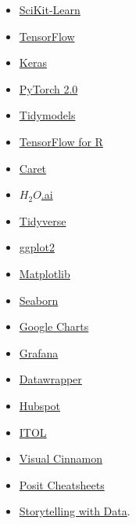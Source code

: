\documentclass[
]{article}
\providecommand{\tightlist}{%
  \setlength{\itemsep}{0pt}\setlength{\parskip}{0pt}}
\begin{document}
\begin{itemize}
\tightlist
\item
  \href{https://scikit-learn.org/stable/}{SciKit-Learn}
\item
  \href{https://www.tensorflow.org}{TensorFlow}
\item
  \href{https://keras.io/examples/}{Keras}
\item
  \href{https://pytorch.org}{PyTorch 2.0}
\item
  \href{https://www.tidymodels.org}{Tidymodels}
\item
  \href{https://tensorflow.rstudio.com/?_gl=1*mehmyf*_ga*MTMyMDE5NzEyMi4xNjg1MDMwNzUx*_ga_2C0WZ1JHG0*MTY4NTE1Njk4My40LjEuMTY4NTE1NzMyMy4wLjAuMA..}{TensorFlow
  for R}
\item
  \href{https://topepo.github.io/caret/}{Caret}
\item
  \href{https://docs.h2o.ai/h2o/latest-stable/h2o-docs/faq/r.html}{\(H_2O\).ai}
\item
  \href{https://www.tidyverse.org}{Tidyverse}
\item
  \href{https://exts.ggplot2.tidyverse.org/gallery/}{ggplot2}
\item
  \href{https://matplotlib.org/stable/index.html}{Matplotlib}
\item
  \href{https://jakevdp.github.io/PythonDataScienceHandbook/04.14-visualization-with-seaborn.html}{Seaborn}
\item
  \href{https://developers.google.com/chart/interactive/docs/gallery}{Google
  Charts}
\item
  \href{https://grafana.com/grafana/}{Grafana}
\item
  \href{https://www.datawrapper.de}{Datawrapper}
\item
  \href{https://www.hubspot.com/resources/tool?hubs_content=blog.hubspot.com\%2Fmarketing\%2Fcolor-combination-data-visualization\&hubs_content-cta=null\&hubs_post=blog.hubspot.com\%2Fmarketing\%2Fcolor-combination-data-visualization\&hubs_post-cta=null\&_ga=2.148478773.327330868.1685158662-882422425.1685158662}{Hubspot}
\item
  \href{https://itol.embl.de/index.shtml}{ITOL}
\item
  \href{https://www.visualcinnamon.com/portfolio/}{Visual Cinnamon}
\item
  \href{https://posit.co/resources/cheatsheets/}{Posit Cheatsheets}
\item
  \href{https://www.storytellingwithdata.com}{Storytelling with Data}.
\end{itemize}
\end{document}
